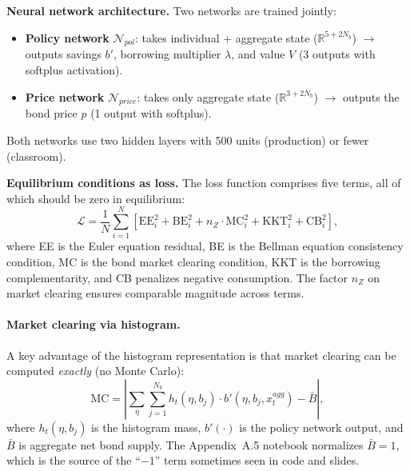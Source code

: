 \documentclass[11pt,a4paper]{report}
\begin{document}
\medskip\noindent\textbf{Neural network architecture.}
Two networks are trained jointly:
\begin{itemize}[itemsep=2pt]
\item \textbf{Policy network} $\mathcal{N}_{pol}$: takes individual + aggregate state ($\mathbb{R}^{5+2N_b}$) $\to$ outputs savings $b'$, borrowing multiplier $\lambda$, and value $V$ (3 outputs with softplus activation).
\item \textbf{Price network} $\mathcal{N}_{price}$: takes only aggregate state ($\mathbb{R}^{3+2N_b}$) $\to$ outputs the bond price $p$ (1 output with softplus).
\end{itemize}
Both networks use two hidden layers with 500 units (production) or fewer (classroom).

\medskip\noindent\textbf{Equilibrium conditions as loss.}
The loss function comprises five terms, all of which should be zero in equilibrium:
\begin{equation}
\mathcal{L} = \frac{1}{N}\sum_{i=1}^{N}\left[\mathrm{EE}_i^2 + \mathrm{BE}_i^2 + n_Z\cdot\mathrm{MC}_i^2 + \mathrm{KKT}_i^2 + \mathrm{CB}_i^2\right],
\label{eq:young_loss}
\end{equation}
where EE is the Euler equation residual, BE is the Bellman equation consistency condition, MC is the bond market clearing condition, KKT is the borrowing complementarity, and CB penalizes negative consumption.  The factor $n_Z$ on market clearing ensures comparable magnitude across terms.

\paragraph{Market clearing via histogram.}
A key advantage of the histogram representation is that market clearing can be computed \emph{exactly} (no Monte Carlo):
\begin{equation}
\mathrm{MC} = \left|\sum_{\eta}\sum_{j=1}^{N_b} h_t(\eta, b_j)\cdot b'(\eta, b_j, x_t^{agg}) - \bar B\right|,
\label{eq:young_mc}
\end{equation}
where $h_t(\eta, b_j)$ is the histogram mass, $b'(\cdot)$ is the policy network output, and $\bar B$ is aggregate net bond supply.  The Appendix~A.5 notebook normalizes $\bar B=1$, which is the source of the ``$-1$'' term sometimes seen in code and slides.
\end{document}
